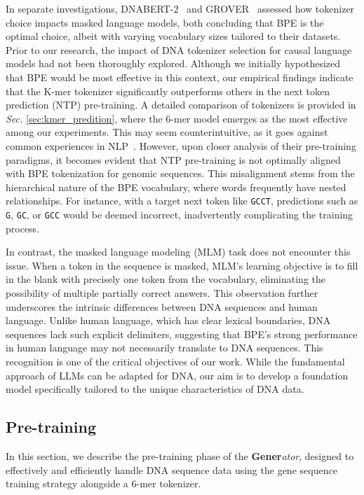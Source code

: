 In separate investigations, DNABERT-2~\cite{DNABERT-2} and GROVER~\cite{GROVER} assessed how tokenizer choice impacts masked language models, both concluding that BPE is the optimal choice, albeit with varying vocabulary sizes tailored to their datasets. Prior to our research, the impact of DNA tokenizer selection for causal language models had not been thoroughly explored. Although we initially hypothesized that BPE would be most effective in this context, our empirical findings indicate that the K-mer tokenizer significantly outperforms others in the next token prediction (NTP) pre-training. A detailed comparison of tokenizers is provided in \textit{Sec.} \ref{sec:kmer_predition}, where the 6-mer model emerges as the most effective among our experiments. This may seem counterintuitive, as it goes against common experiences in NLP~\cite{SentencePiece}. However, upon closer analysis of their pre-training paradigms, it becomes evident that NTP pre-training is not optimally aligned with BPE tokenization for genomic sequences. This misalignment stems from the hierarchical nature of the BPE vocabulary, where words frequently have nested relationships. For instance, with a target next token like \texttt{GCCT}, predictions such as \texttt{G}, \texttt{GC}, or \texttt{GCC} would be deemed incorrect, inadvertently complicating the training process.

In contrast, the masked language modeling (MLM) task does not encounter this issue. When a token in the sequence is masked, MLM's learning objective is to fill in the blank with precisely one token from the vocabulary, eliminating the possibility of multiple partially correct answers. This observation further underscores the intrinsic differences between DNA sequences and human language. Unlike human language, which has clear lexical boundaries, DNA sequences lack such explicit delimiters, suggesting that BPE's strong performance in human language may not necessarily translate to DNA sequences. This recognition is one of the critical objectives of our work. While the fundamental approach of LLMs can be adapted for DNA, our aim is to develop a foundation model specifically tailored to the unique characteristics of DNA data.

\subsection{Pre-training}
In this section, we describe the pre-training phase of the \textbf{Gener}\textit{ator}, designed to effectively and efficiently handle DNA sequence data using the gene sequence training strategy alongside a 6-mer tokenizer.

